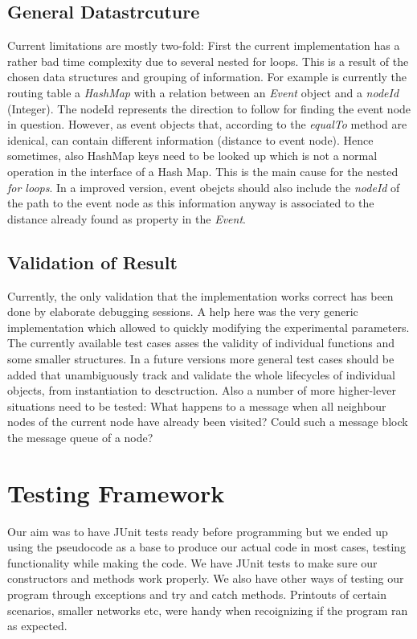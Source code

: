 \documentclass[a4paper,11pt,twoside]{article}
\begin{document}
\subsection{General Datastrcuture}
Current limitations are mostly two-fold: First the current
implementation has a rather bad time complexity due to several nested
for loops. This is a result of the chosen data structures and grouping
of information. For example is currently the routing table a \textit{HashMap}
with a relation between an \textit{Event} object and a \textit{nodeId}
(Integer). The nodeId represents the direction to follow for finding
the event node in question. However, as event objects that, according
to the \textit{equalTo} method are idenical, can contain different information
(distance to event node). Hence sometimes, also HashMap keys need to
be looked up which is not a normal operation in the interface of a
Hash Map. This is the main cause for the nested \textit{for loops}. In a
improved version, event obejcts should also include the \textit{nodeId} of the
path to the event node as this information anyway is associated to the
distance already found as property in the \textit{Event}. 

\subsection{Validation of Result}
Currently, the only validation that the implementation works correct
has been done by elaborate debugging sessions. A help here was the
very generic implementation which allowed to quickly modifying the
experimental parameters. The currently available test cases asses the
validity of individual functions and some smaller structures. In a
future versions more general test cases should be added that
unambiguously track and validate the whole lifecycles of individual
objects, from instantiation to desctruction. 
Also a number of more higher-lever situations need to be tested: What
happens to a message when all neighbour nodes of the current node have
already been visited? Could such a message block the message queue of
a node?   



\section{Testing Framework}

Our aim was to have JUnit tests ready before programming but we ended
up using the pseudocode as a base to produce our actual code in most
cases, testing functionality while making the code. We have JUnit
tests to make sure our constructors and methods work properly. We also
have other ways of testing our program through exceptions and try and
catch methods. Printouts of certain scenarios, smaller networks etc,
were handy when recoignizing if the program ran as expected. 
\end{document}
